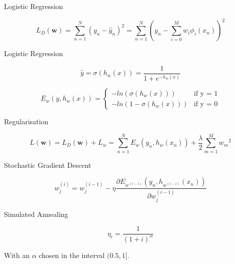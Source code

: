 \begin{frame}{Logistic Regression}

\[ L_D(\textbf{w}) = \sum_{n=1}^N (y_n-\hat{y}_n)^2 = \sum_{n=1}^N \left(y_n - \sum_{i=0}^M w_i \phi_i(x_n)\right)^{2} \] 

\end{frame}

\begin{frame}{Logistic Regression}

\[ \hat{y} = \sigma(h_w(x)) = \frac{1}{1+e^{-h_w(x)}} \]

\[E_w(y,h_w(x)) = \begin{cases}
	-ln(\sigma(h_w(x))) &\text{if y = 1}\\	
	-ln(1-\sigma(h_w(x))) &\text{if y = 0}
\end{cases}\]

\end{frame}

\begin{frame}{Regularisation}

\[ L(\mathbf{w})
  = L_D(\mathbf{w}) + L_w 
  = \sum_{n=1}^N E_w(y_n, h_w(x_n)) + \frac{\lambda}{2} \sum_{m=1}^{M} {w_m}^2 \] 

\end{frame}

\begin{frame}{Stochastic Gradient Descent}

\[ w_j^{(i)} = w_j^{(i-1)} - \eta \frac{\partial E_{w^{(i-1)}}(y_n, h_{w^{(i-1)}}(x_n))}{\partial w_j^{(i-1)}} \]

\end{frame}


\begin{frame}{Simulated Annealing}

$$\eta_i = \frac{1}{(1+i)^\alpha}$$


With an $\alpha$ chosen in the interval $(0.5,1]$. 

\end{frame}




